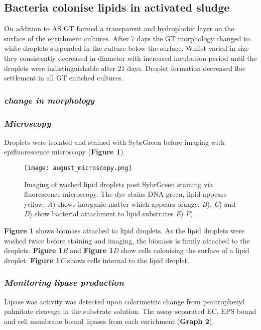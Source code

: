 \documentclass[11pt]{article}
\begin{document}
\subsection{Bacteria colonise lipids in activated sludge}
On addition to AS GT formed a transparent and hydrophobic layer on the surface of the enrichment cultures. After 7 days the GT morphology changed to white droplets suspended in the culture below the surface. Whilst varied in size they consistently decreased in diameter with increased incubation period until the droplets were indistinguishable after 21 days. Droplet formation decreased floc settlement in all GT enriched cultures.

\subsubsection{\emph{change in morphology}}

\subsubsection{\emph{Microscopy}}
 Droplets were isolated and stained with SybrGreen before imaging with epifluorescence microscopy (\textbf{Figure 1}). 

\begin{figure}
\texttt{[image: august\_microscopy.png]}
\caption{Imaging of washed lipid droplets post SybrGreen staining via fluorescence microscopy. The dye stains DNA green, lipid appears yellow. \textit{A}) shows inorganic matter which appears orange; \textit{B}), \textit{C}) and \textit{D}) show bacterial attachment to lipid substrates \textit{E}) \textit{F}).}
\end{figure}


\textbf{Figure 1 } shows biomass attached to lipid droplets. As the lipid droplets were washed twice before staining and imaging, the biomass is firmly attached to the droplets. \textbf{Figure 1}\textit{B} and \textbf{Figure 1}\textit{D} show cells colonising the surface of a lipid droplet. \textbf{Figure 1}\textit{C} shows cells internal to the lipid droplet.

\subsubsection{\emph{Monitoring lipase production}}
Lipase was activity was detected upon colorimetric change from p-nitrophenyl palmitate cleavage in the substrate solution. The assay separated  EC, EPS bound and cell membrane bound lipases from each enrichment (\textbf{Graph 2}).
\end{document}
